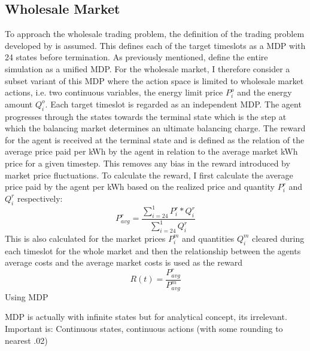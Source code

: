 
\subsection{Wholesale Market}
\label{sub:wholesale_market}

To approach the wholesale trading problem, the definition of the trading problem developed by
\citet{tactexurieli2016mdp} is assumed. This defines each of the target timeslots as a \ac{MDP} with 24 states before
termination. As previously mentioned, \citet{tactexurieli2016mdp} define the entire simulation as a unified \ac{MDP}.
For the wholesale market, I therefore consider a subset variant of this \ac{MDP} where the action space is limited to
wholesale market actions, i.e.
two continuous variables, the energy limit price $P^o_i$ and the energy amount $Q^o_i$. Each target timeslot is regarded as
an independent \ac{MDP}. The agent progresses through the states towards the terminal state which is the step at which
the balancing market determines an ultimate balancing charge. The reward for the agent is received at the terminal state
and is defined as the relation of the average price paid per \ac{kWh} by the agent in relation to the average market
\ac{kWh}
price for a given timestep. This removes any bias in the reward introduced by market price fluctuations. To calculate
the reward, I first calculate the average price paid by the agent per \ac{kWh} based on the realized price and quantity
$P^r_i$ and $Q^r_i$ respectively:
\begin{equation}
    \label{eq:Average price per kWh for a given target timeslot}
    P^{r}_{avg} =\frac{\sum ^{1}_{i=24} P^{r}_{i} *Q^{r}_{i}}{\sum ^{1}_{i=24} Q^{r}_{i}}


\end{equation}
This is also calculated for the market prices $P^m_{i}$ and quantities $Q^m_i$ cleared during each timeslot for the whole market and then the
relationship between the agents average costs and the average market costs is used as the reward
\begin{equation}
R(t) = \frac{P^r_{avg}}{P^m_{avg}}
\end{equation}
Using \ac {MDP}

\ac {MDP} is actually with infinite states but for analytical concept, its irrelevant. Important is: Continuous states,
continuous actions (with some rounding to nearest .02)

